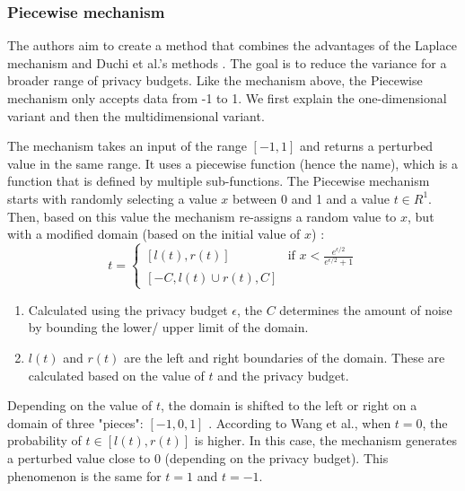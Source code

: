 \subsubsection*{Piecewise mechanism} \label{theory:piecewise}
The authors aim to create a method that combines the advantages of the Laplace mechanism and Duchi et al.'s methods \citep{wang_collecting_2019}.
The goal is to reduce the variance for a broader range of privacy budgets.
Like the mechanism above, the Piecewise mechanism only accepts data from -1 to 1.
We first explain the one-dimensional variant and then the multidimensional variant. \newpage

The mechanism takes an input of the range $[-1, 1]$ and returns a perturbed value in the same range.
It uses a piecewise function (hence the name), which is a function that is defined by multiple sub-functions.
The Piecewise mechanism starts with randomly selecting a value $x$ between 0 and 1 and a value $t \in R^1$.
Then, based on this value the mechanism re-assigns a random value to $x$, but with a modified domain (based on the initial value of $x$) \citep{wang_collecting_2019}:
\begin{equation}
  t = \begin{cases}
    [l(t), r(t)] & \text{if } x < \frac{e^{\epsilon/2}}{e^{\epsilon/2}+1} \\
    [-C, l(t) \cup r(t), C]
  \end{cases}
\end{equation}
\begin{enumerate}
  \item Calculated using the privacy budget $\epsilon$, the $C$ determines the amount of noise by bounding the lower/ upper limit of the domain.
  \item $l(t)$ and $r(t)$ are the left and right boundaries of the domain. These are calculated based on the value of $t$ and the privacy budget.
\end{enumerate}
Depending on the value of $t$, the domain is shifted to the left or right on a domain of three "pieces": $[-1, 0, 1]$ \citep{wang_collecting_2019}.
According to Wang et al., when $t = 0$, the probability of $t \in [l(t), r(t)]$ is higher.
In this case, the mechanism generates a perturbed value close to $0$ (depending on the privacy budget).
This phenomenon is the same for $t = 1$ and $t = -1$. \newline

